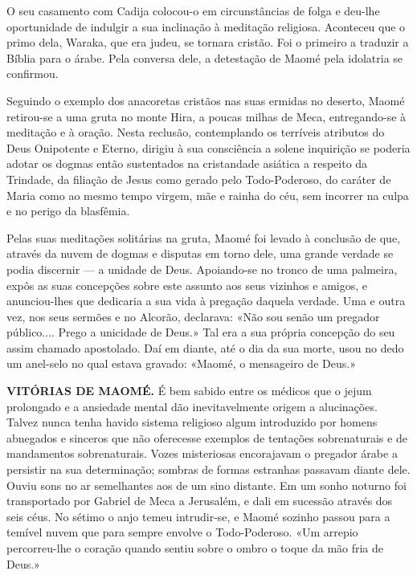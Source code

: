 \documentclass[11pt,a5paper,twoside,openany]{book}
\begin{document}
O seu casamento com Cadija colocou-o em circunstâncias de folga e deu-lhe oportunidade de indulgir a sua inclinação à meditação religiosa. Aconteceu que o primo dela, Waraka, que era judeu, se tornara cristão. Foi o primeiro a traduzir a Bíblia para o árabe. Pela conversa dele, a detestação de Maomé pela idolatria se confirmou.

Seguindo o exemplo dos anacoretas cristãos nas suas ermidas no deserto, Maomé retirou-se a uma gruta no monte Hira, a poucas milhas de Meca, entregando-se à meditação e à oração. Nesta reclusão, contemplando os terríveis atributos do Deus Onipotente e Eterno, dirigiu à sua consciência a solene inquirição se poderia adotar os dogmas então sustentados na cristandade asiática a respeito da Trindade, da filiação de Jesus como gerado pelo Todo-Poderoso, do caráter de Maria como ao mesmo tempo virgem, mãe e rainha do céu, sem incorrer na culpa e no perigo da blasfêmia.

Pelas suas meditações solitárias na gruta, Maomé foi levado à conclusão de que, através da nuvem de dogmas e disputas em torno dele, uma grande verdade se podia discernir — a unidade de Deus. Apoiando-se no tronco de uma palmeira, expôs as suas concepções sobre este assunto aos seus vizinhos e amigos, e anunciou-lhes que dedicaria a sua vida à pregação daquela verdade. Uma e outra vez, nos seus sermões e no Alcorão, declarava: «Não sou senão um pregador público.... Prego a unicidade de Deus.» Tal era a sua própria concepção do seu assim chamado apostolado. Daí em diante, até o dia da sua morte, usou no dedo um anel-selo no qual estava gravado: «Maomé, o mensageiro de Deus.»

\textbf{VITÓRIAS DE MAOMÉ.} É bem sabido entre os médicos que o jejum prolongado e a ansiedade mental dão inevitavelmente origem a alucinações. Talvez nunca tenha havido sistema religioso algum introduzido por homens abnegados e sinceros que não oferecesse exemplos de tentações sobrenaturais e de mandamentos sobrenaturais. Vozes misteriosas encorajavam o pregador árabe a persistir na sua determinação; sombras de formas estranhas passavam diante dele. Ouviu sons no ar semelhantes aos de um sino distante. Em um sonho noturno foi transportado por Gabriel de Meca a Jerusalém, e dali em sucessão através dos seis céus. No sétimo o anjo temeu intrudir-se, e Maomé sozinho passou para a temível nuvem que para sempre envolve o Todo-Poderoso. «Um arrepio percorreu-lhe o coração quando sentiu sobre o ombro o toque da mão fria de Deus.»
\end{document}
